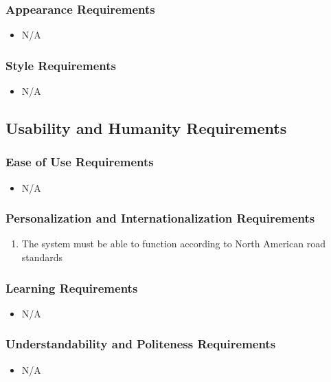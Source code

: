 \documentclass [12pt]{article}
\begin{document}
\subsubsection{Appearance Requirements}
	\begin{itemize}
		\item  N/A
	\end{itemize}


\subsubsection{Style Requirements}
	\begin{itemize}
		\item N/A
	\end{itemize}

\subsection{\large Usability and Humanity Requirements} 
\subsubsection{Ease of Use Requirements}
	\begin{itemize}
		\item N/A
	\end{itemize}

\subsubsection{Personalization and Internationalization Requirements}
	\begin{enumerate}[label=\textbf{\Alph*}:]
		\item The system must be able to function according to North American road standards
	\end{enumerate}

\subsubsection{Learning Requirements }
	\begin{itemize}
		\item N/A
	\end{itemize}

\subsubsection{Understandability and Politeness Requirements}
	\begin{itemize}
		\item N/A
	\end{itemize}
		
\end{document}
